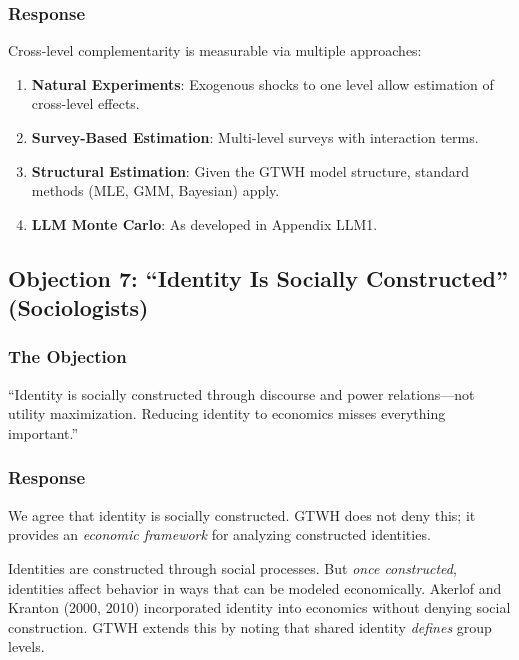 \subsubsection{Response}

Cross-level complementarity is measurable via multiple approaches:

\begin{enumerate}
\item \textbf{Natural Experiments}: Exogenous shocks to one level allow estimation 
of cross-level effects.
\item \textbf{Survey-Based Estimation}: Multi-level surveys with interaction terms.
\item \textbf{Structural Estimation}: Given the GTWH model structure, standard 
methods (MLE, GMM, Bayesian) apply.
\item \textbf{LLM Monte Carlo}: As developed in Appendix LLM1.
\end{enumerate}

\subsection{Objection 7: ``Identity Is Socially Constructed'' (Sociologists)}

\subsubsection{The Objection}

\begin{tcolorbox}[colback=red!5!white, colframe=red!75!black, title=Sociologist's Objection]
``Identity is socially constructed through discourse and power relations---not 
utility maximization. Reducing identity to economics misses everything important.''
\end{tcolorbox}

\subsubsection{Response}

We agree that identity is socially constructed. GTWH does not deny this; it 
provides an \textit{economic framework} for analyzing constructed identities.

Identities are constructed through social processes. But \textit{once constructed}, 
identities affect behavior in ways that can be modeled economically. Akerlof and 
Kranton (2000, 2010) incorporated identity into economics without denying social 
construction. GTWH extends this by noting that shared identity \textit{defines} 
group levels.

